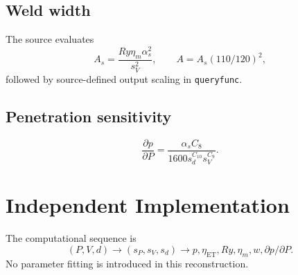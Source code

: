 \documentclass[11pt,a4paper]{article}
\begin{document}
\subsection{Weld width}
The source evaluates
\begin{equation}
A_s=\frac{Ry\eta_m\alpha_s^2}{s_V^2},
\qquad A=A_s(110/120)^2,
\end{equation}
followed by source-defined output scaling in \texttt{queryfunc}.
\subsection{Penetration sensitivity}
\begin{equation}
\frac{\partial p}{\partial P}=
\frac{\alpha_sC_8}{1600s_d^{C_{10}}s_V^{C_9}}.
\end{equation}
\section{Independent Implementation}
The computational sequence is
\begin{equation}
(P,V,d)\rightarrow(s_P,s_V,s_d)\rightarrow
p,\eta_{\mathrm{ET}},Ry,\eta_m,w,\partial p/\partial P.
\end{equation}
No parameter fitting is introduced in this reconstruction.
\end{document}
